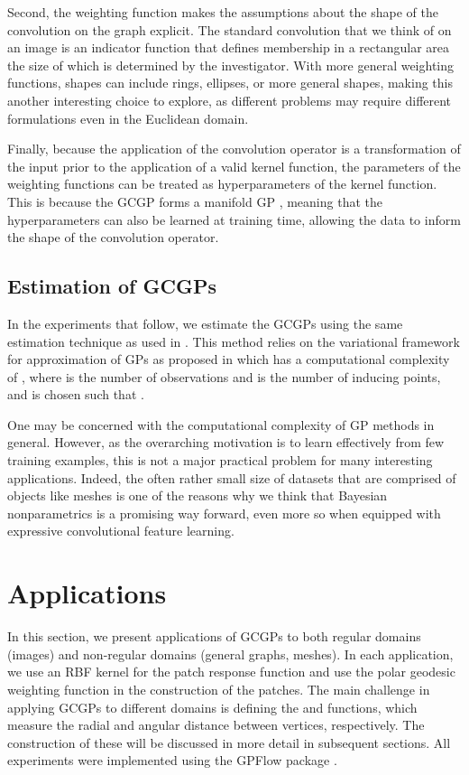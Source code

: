 \documentclass{article}
\begin{document}
Second, the weighting function makes the assumptions about the shape of the convolution on the graph explicit. The standard convolution that we think of on an image is an indicator function that defines membership in a rectangular area the size of which is determined by the investigator. With more general weighting functions, shapes can include rings, ellipses, or more general shapes, making this another interesting choice to explore, as different problems may require different formulations even in the Euclidean domain.

Finally, because the application of the convolution operator is a transformation of the input prior to the application of a valid kernel function, the parameters of the weighting functions  can be treated as hyperparameters of the kernel function. This is because the GCGP forms a manifold GP \citep{manifoldGP}, meaning that the hyperparameters can also be learned at training time, allowing the data to inform the shape of the convolution operator.

\subsection{Estimation of GCGPs}
In the experiments that follow, we estimate the GCGPs using the same estimation technique as used in \citet{convgp}. This method relies on the variational framework for approximation of GPs as proposed in \citet{pmlr-v38-hensman15} which has a computational complexity of , where  is the number of observations and  is the number of inducing points, and  is chosen such that .

One may be concerned with the computational complexity of GP methods in general. However, as the overarching motivation is to learn effectively from few training examples, this is not a major practical problem for many interesting applications. Indeed, the often rather small size of datasets that are comprised of objects like meshes is one of the reasons why we think that Bayesian nonparametrics is a promising way forward, even more so when equipped with expressive convolutional feature learning. 

\section{Applications}

In this section, we present applications of GCGPs to both regular domains (images) and non-regular domains (general graphs, meshes). In each application, we use an RBF kernel for the patch response function  and use the polar geodesic weighting function in the construction of the patches. The main challenge in applying GCGPs to different domains is defining the  and  functions, which measure the radial and angular distance between vertices, respectively. The construction of these will be discussed in more detail in subsequent sections. All experiments were implemented using the GPFlow package \citep{GPflow2017}.
\end{document}
